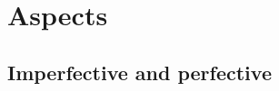 
\clearpage
\section{Aspects}\label{sec:asp}

\begin{multicols}{2}
\noindent
\end{multicols}

\clearpage
\subsection{Imperfective and perfective}\label{sec:asp-impfvpfv}

\begin{multicols}{2}
\noindent
\end{multicols}

